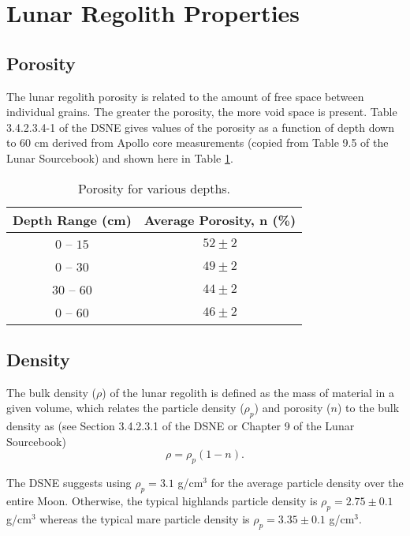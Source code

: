 \documentclass{article}
\begin{document}
\section{Lunar Regolith Properties}

\subsection{Porosity}

The lunar regolith porosity is related to the amount of free space between individual grains. The greater the porosity, the more void space is present. Table 3.4.2.3.4-1 of the DSNE gives values of the porosity as a function of depth down to $60$ cm derived from Apollo core measurements (copied from Table 9.5 of the Lunar Sourcebook) and shown here in Table \ref{tab:porosity}.


\begin{table}[h!]
	\begin{center}
		\caption{Porosity for various depths.}
		\label{tab:porosity}
		\begin{tabular}{c c}
			\hline
			Depth Range (cm)  & Average Porosity, n (\%)  \\
			\hline
			$0$ -- $15$  & $52\pm 2$  \\
			$0$ -- $30$  & $49\pm 2$   \\
			$30$ -- $60$ & $44\pm 2$   \\
			$0$ -- $6$0  & $46\pm 2$  \\\hline
		\end{tabular}
	\end{center}
\end{table}


\subsection{Density}

The bulk density ($\rho$) of the lunar regolith is defined as the mass of material in a given volume, which relates the particle density ($\rho_p$) and porosity ($n$) to the bulk density as (see Section 3.4.2.3.1 of the DSNE or Chapter 9 of the Lunar Sourcebook)
\begin{equation}
\rho = \rho_p(1-n).
\end{equation}

The DSNE suggests using $\rho_p = 3.1$ g/cm$^3$ for the average particle density over the entire Moon. Otherwise, the typical highlands particle density is $\rho_p = 2.75\pm 0.1$ g/cm$^3$ whereas the typical mare particle density is $\rho_p = 3.35\pm 0.1$ g/cm$^3$.
\end{document}
